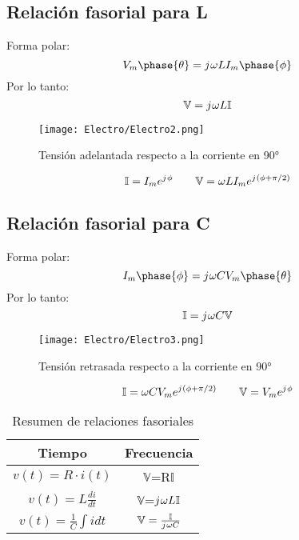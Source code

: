\documentclass[
	12pt, %
	fleqn, %
	a4paper, %
]{LegrandOrangeBook}
\begin{document}
\subsection{Relación fasorial para L}
Forma polar:
\begin{displaymath}
V_m\phase{\theta}=\iu\omega LI_m\phase{\phi}
\end{displaymath}
Por lo tanto:
\begin{displaymath}
\mathbb{V}={j\mkern1mu}\omega L\mathbb{I}
\end{displaymath}
\begin{figure}[H]
\centering
\texttt{[image: Electro/Electro2.png]}
\caption{Tensión adelantada respecto a la corriente en 90°}
\end{figure}
\begin{equation*}
\mathbb{I}=I_me^{{j\mkern1mu}\phi}
\qquad
\mathbb{V}=\omega LI_me^{{j\mkern1mu}(\phi+\pi/2)}
\end{equation*}
\subsection{Relación fasorial para C}
Forma polar:
\begin{displaymath}
I_m\phase{\phi}=\iu\omega CV_m\phase{\theta}
\end{displaymath}
Por lo tanto:
\begin{displaymath}
\mathbb{I}={j\mkern1mu}\omega C\mathbb{V}
\end{displaymath}
\begin{figure}[H]
\centering
\texttt{[image: Electro/Electro3.png]}
\caption{Tensión retrasada respecto a la corriente en 90°}
\end{figure}
\begin{equation*}
\mathbb{I}=\omega CV_me^{{j\mkern1mu}(\phi+\pi/2)}
\qquad
\mathbb{V}=V_me^{{j\mkern1mu}\phi}
\end{equation*}
\begin{table}[H]
\begin{center}
\begin{tabular}{|c|c|}
\hline
\rowcolor[HTML]{34CDF9} 
Tiempo                     & Frecuencia                                  \\ \hline
$v(t)=R\cdot i(t)$         & $\mathbb{V}$=R$\mathbb{I}$                  \\ \hline
$v(t)=L\frac{di}{dt}$      & $\mathbb{V}$=${j\mkern1mu}\omega L\mathbb{I}$        \\ \hline
$v(t)=\frac{1}{C}\int idt$ & $\mathbb{V}=\frac{\mathbb{I}}{{j\mkern1mu}\omega C}$ \\ \hline
\end{tabular}
\end{center}
\caption{Resumen de relaciones fasoriales}
\end{table}
\end{document}
